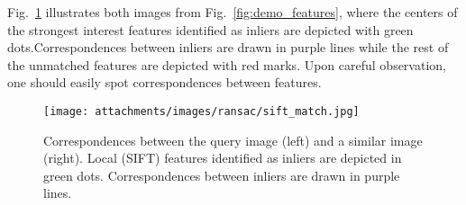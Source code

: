 Fig.~\ref{fig:sift_matches} illustrates both images from Fig.~\ref{fig:demo_features}, where the centers of the strongest interest features identified as inliers are depicted with green dots.Correspondences between inliers are drawn in purple lines while the rest of the unmatched features are depicted with red marks. Upon careful observation, one should easily spot correspondences between features.

\begin{figure}[h!]
  \centering
  \texttt{[image: attachments/images/ransac/sift\_match.jpg]}
  \caption{Correspondences between the query image (left) and a similar image (right). Local (SIFT) features identified as inliers are depicted in green dots. Correspondences between inliers are drawn in purple lines.}
  \label{fig:sift_matches}
\end{figure}

